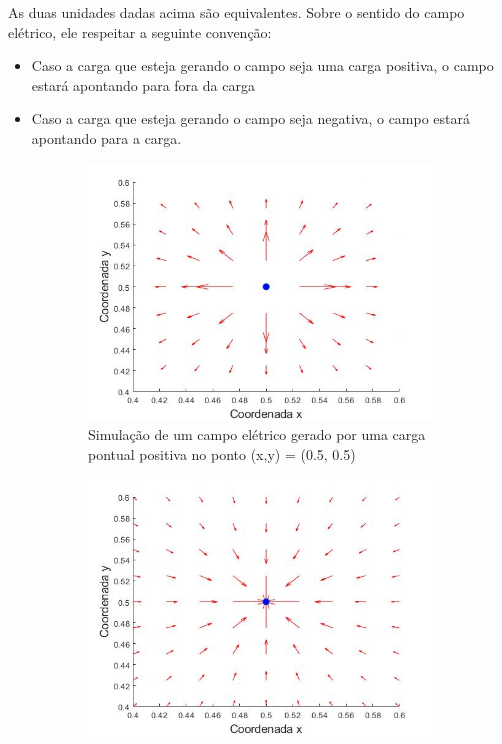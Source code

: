 \documentclass[12pt]{extarticle}
\newcommand{\<}{\langle}
\renewcommand{\>}{\rangle}
\theoremstyle{definition}
\begin{document}
As duas unidades dadas acima são equivalentes. Sobre o sentido do campo elétrico, ele respeitar a seguinte convenção:
\begin{itemize}
    \item Caso a carga que esteja gerando o campo seja uma carga positiva, o campo estará apontando para fora da carga
    \item Caso a carga que esteja gerando o campo seja negativa, o campo estará apontando para a carga.
\end{itemize}

\begin{figure}[H]
     \centering
     \begin{subfigure}[b]{0.45\textwidth}
         \centering
         \includegraphics[width=\textwidth]{simu_campo_eletrico_carga_+.jpg}
         \caption{Simulação de um campo elétrico gerado por uma carga pontual positiva no ponto (x,y) = (0.5, 0.5)}
         \label{fig:field_+}
     \end{subfigure}
     \quad\quad
     \begin{subfigure}[b]{0.45\textwidth}
         \centering
         \includegraphics[width=\textwidth]{simu_campo_eletrico_carga_-.jpg}

\end{subfigure}
\end{figure}
\end{document}
